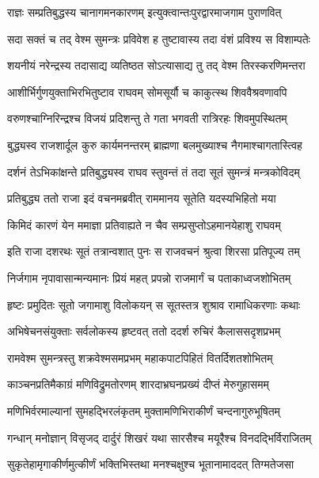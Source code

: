 \twolineshloka
{राज्ञः सम्प्रतिबुद्धस्य चानागमनकारणम्}
{इत्युक्त्वान्तःपुरद्वारमाजगाम पुराणवित्} %

\twolineshloka
{सदा सक्तं च तद् वेश्म सुमन्त्रः प्रविवेश ह}
{तुष्टावास्य तदा वंशं प्रविश्य स विशाम्पतेः} %

\twolineshloka
{शयनीयं नरेन्द्रस्य तदासाद्य व्यतिष्ठत}
{सोऽत्यासाद्य तु तद् वेश्म तिरस्करणिमन्तरा} %

\twolineshloka
{आशीर्भिर्गुणयुक्ताभिरभितुष्टाव राघवम्}
{सोमसूर्यौ च काकुत्स्थ शिववैश्रवणावपि} %

\twolineshloka
{वरुणश्चाग्निरिन्द्रश्च विजयं प्रदिशन्तु ते}
{गता भगवती रात्रिरहः शिवमुपस्थितम्} %

\twolineshloka
{बुद्ध्यस्व राजशार्दूल कुरु कार्यमनन्तरम्}
{ब्राह्मणा बलमुख्याश्च नैगमाश्चागतास्त्विह} %

\twolineshloka
{दर्शनं तेऽभिकांक्षन्ते प्रतिबुद्ध्यस्व राघव}
{स्तुवन्तं तं तदा सूतं सुमन्त्रं मन्त्रकोविदम्} %

\twolineshloka
{प्रतिबुद्ध्य ततो राजा इदं वचनमब्रवीत्}
{राममानय सूतेति यदस्यभिहितो मया} %

\twolineshloka
{किमिदं कारणं येन ममाज्ञा प्रतिवाह्यते}
{न चैव सम्प्रसुप्तोऽहमानयेहाशु राघवम्} %

\twolineshloka
{इति राजा दशरथः सूतं तत्रान्वशात् पुनः}
{स राजवचनं श्रुत्वा शिरसा प्रतिपूज्य तम्} %

\twolineshloka
{निर्जगाम नृपावासान्मन्यमानः प्रियं महत्}
{प्रपन्नो राजमार्गं च पताकाध्वजशोभितम्} %

\twolineshloka
{हृष्टः प्रमुदितः सूतो जगामाशु विलोकयन्}
{स सूतस्तत्र शुश्राव रामाधिकरणाः कथाः} %

\twolineshloka
{अभिषेचनसंयुक्ताः सर्वलोकस्य हृष्टवत्}
{ततो ददर्श रुचिरं कैलाससदृशप्रभम्} %

\twolineshloka
{रामवेश्म सुमन्त्रस्तु शक्रवेश्मसमप्रभम्}
{महाकपाटपिहितं वितर्दिशतशोभितम्} %

\twolineshloka
{काञ्चनप्रतिमैकाग्रं मणिविद्रुमतोरणम्}
{शारदाभ्रघनप्रख्यं दीप्तं मेरुगुहासमम्} %

\twolineshloka
{मणिभिर्वरमाल्यानां सुमहद्भिरलंकृतम्}
{मुक्तामणिभिराकीर्णं चन्दनागुरुभूषितम्} %

\twolineshloka
{गन्धान् मनोज्ञान् विसृजद् दार्दुरं शिखरं यथा}
{सारसैश्च मयूरैश्च विनदद्भिर्विराजितम्} %

\twolineshloka
{सुकृतेहामृगाकीर्णमुत्कीर्णं भक्तिभिस्तथा}
{मनश्चक्षुश्च भूतानामाददत् तिग्मतेजसा} %

